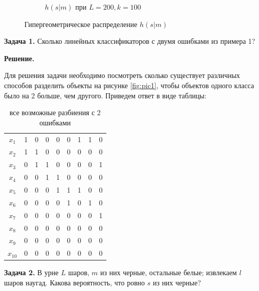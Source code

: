 \begin{figure}[hbt!]
\begin{subfigure}[t]{0.45\textwidth}
        \caption{$h(s|m)$ при $L=200, k=100$}
        \label{fig:pic4}
    \end{subfigure}
    \caption{Гипергеометрическое распределение $h(s|m)$}
\end{figure}

\textbf{Задача 1.} Сколько линейных классификаторов с двумя ошибками из примера 1?

\textbf{Решение.}

Для решения задачи необходимо посмотреть сколько существует различных способов разделить объекты на рисунке \ref{fig:pic1}, чтобы объектов одного класса было на 2 больше, чем другого. Приведем ответ в виде таблицы:

\begin{table}[hbt!]
    \begin{tabular}{c|cccccccc}
		$x_1$ & 1 & 0 & 0 & 0 & 0 & 1 & 1 & 0 \\
    $x_2$ & 1 & 1 & 0 & 0 & 0 & 0 & 0 & 0 \\
		$x_3$ & 0 & 1 & 1 & 0 & 0 & 0 & 0 & 1 \\
    $x_4$ & 0 & 0 & 1 & 1 & 0 & 0 & 0 & 0 \\
    $x_5$ & 0 & 0 & 0 & 1 & 1 & 1 & 0 & 0 \\
    $x_6$ & 0 & 0 & 0 & 0 & 1 & 0 & 1 & 0 \\
    $x_7$ & 0 & 0 & 0 & 0 & 0 & 0 & 0 & 1 \\
    $x_8$ & 0 & 0 & 0 & 0 & 0 & 0 & 0 & 0 \\
    $x_9$ & 0 & 0 & 0 & 0 & 0 & 0 & 0 & 0 \\
 $x_{10}$ & 0 & 0 & 0 & 0 & 0 & 0 & 0 & 0 \\
    \end{tabular}
    \caption{все возможные разбиения с 2 ошибками}
\end{table}

\textbf{Задача 2.} В урне $L$ шаров, $m$ из них черные, остальные белые; извлекаем $l$ шаров наугад. Какова вероятность, что ровно $s$ из них черные?

